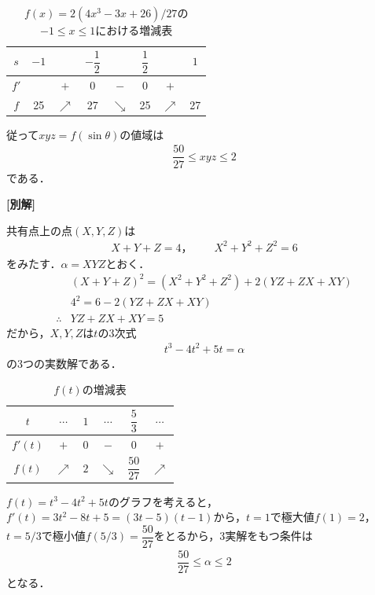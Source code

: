 \documentclass[../../main.tex]{subfiles}
\begin{document}
\begin{table}[htb]
  \centering
  \caption{$f(x)=2(4x^3-3x+26)/27$の$-1 \le x \le 1$における増減表}
  \begin{tabular}{c|ccccccc}
    $s$ & $-1$ & & $-\dfrac{1}{2}$ & & $\dfrac{1}{2}$ & & $1$ \\
    \hline
    $f'$ & & $+$ & $0$ & $-$ & $0$ & $+$ & \\
    \hline
    $f$ & 25 & $\nearrow$ & 27 & $\searrow$ & 25 & $\nearrow$ & 27 \\
  \end{tabular}
\end{table}

従って$xyz=f(\sin\theta)$の値域は
\begin{align}
  \dfrac{50}{27}\le xyz \le 2
\end{align}
である．

{\bf [別解]}

共有点上の点$(X,Y,Z)$は
\begin{align}
  X+Y+Z=4，\qquad X^2+Y^2+Z^2=6
\end{align}
をみたす．$\alpha=XYZ$とおく．
\begin{align}
  & (X+Y+Z)^2 =(X^2+Y^2+Z^2) + 2(YZ+ZX+XY) \\
  & 4^2 = 6 - 2(YZ+ZX+XY) \\
  \therefore
  & YZ+ZX+XY=5 \label{eq:4}
\end{align}
だから，$X,Y,Z$は$t$の3次式
\begin{align}
  t^3-4t^2+5t=\alpha
\end{align}
の3つの実数解である．

\begin{table}[htb]
  \centering
  \caption{$f(t)$の増減表}
  \label{tab:f_variation}
  \begin{tabular}{c|ccccc}
    \hline
    $t$ & $\cdots$ & $1$ & $\cdots$ & $\dfrac{5}{3}$ & $\cdots$ \\
    \hline
    $f'(t)$ & $+$ & $0$ & $-$ & $0$ & $+$ \\
    \hline
    $f(t)$ & $\nearrow$ & $2$ & $\searrow$ & $\dfrac{50}{27}$ & $\nearrow$ \\
    \hline
  \end{tabular}
\end{table}

$f(t)=t^3-4t^2+5t$のグラフを考えると，$f'(t)=3t^2-8t+5=(3t-5)(t-1)$から，$t=1$で極大値$f(1)=2$，$t=5/3$で極小値$f(5/3)=\dfrac{50}{27}$をとるから，3実解をもつ条件は
\begin{align}
  \dfrac{50}{27}\le\alpha\le2
\end{align}
となる．
\end{document}
